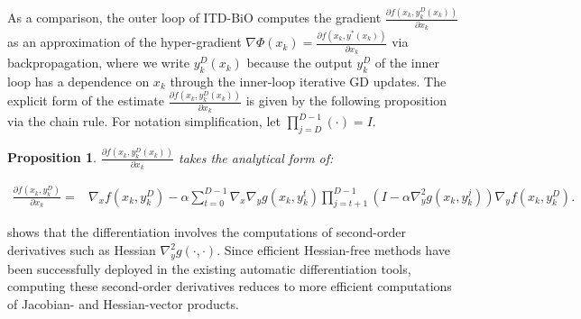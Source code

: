 \documentclass{osudissert96}
\newtheorem{proposition}{Proposition}
\begin{document}
	
As a comparison, the outer loop of ITD-BiO computes the gradient $\frac{\partial f(x_k,y^D_k(x_k))}{\partial x_k}$  as an approximation of the hyper-gradient $\nabla \Phi(x_k)=\frac{\partial f(x_k,y^*(x_k))}{\partial x_k}$ via backpropagation, where we write  $y^D_k(x_k)$ because the output $y_k^D$ of the inner loop has a dependence on $x_k$ through the inner-loop iterative GD updates. The explicit form of the estimate $\frac{\partial f(x_k,y^D_k(x_k))}{\partial x_k}$ is given by the following proposition via the chain rule. For notation simplification, let $\prod_{j=D}^{D-1} (\cdot)= I$.
   \begin{proposition}\label{deter:gdform}
 $\frac{\partial f(x_k,y^D_k(x_k))}{\partial x_k}$ takes the analytical form of:
\begin{small}
\begin{align*}
\frac{\partial f(x_k,y^D_k)}{\partial x_k}= &\nabla_x f(x_k,y_k^D) -\alpha\sum_{t=0}^{D-1}\nabla_x\nabla_y g(x_k,y_k^{t})\prod_{j=t+1}^{D-1}(I-\alpha  \nabla^2_y g(x_k,y_k^{j}))\nabla_y f(x_k,y_k^D).
\end{align*}
\end{small}
\end{proposition}
  shows that the differentiation involves the computations of second-order derivatives such as Hessian $ \nabla^2_y g(\cdot,\cdot)$. Since efficient Hessian-free methods  have been successfully deployed in the existing automatic differentiation tools, computing these second-order derivatives reduces to more efficient computations of Jacobian- and Hessian-vector products.  
\end{document}
